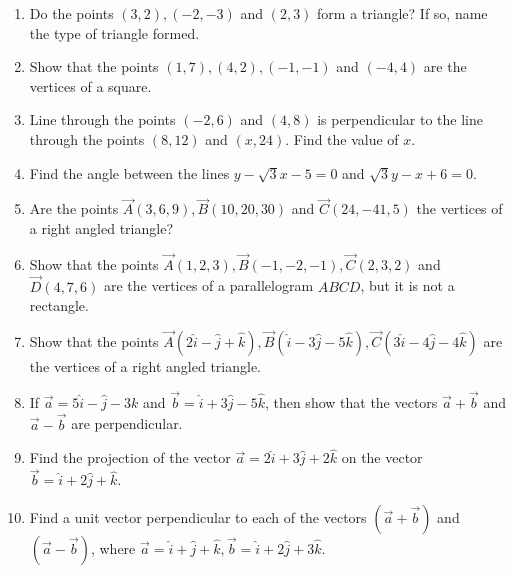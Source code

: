 \begin{enumerate}[label=\thesubsection.\arabic*, ref=\thesubsection.\theenumi]
\item Do the points $(3,2), (-2,-3)$ and $(2,3)$ form a triangle? If so, name the type of triangle formed.
\item Show that the points $(1,7),(4,2),(-1,-1)$ and $(-4,4)$ are the vertices of a square.
\item Line through the points $(-2,6)$ and $(4,8)$ is perpendicular to the line through the points $(8,12)$ and $(x,24)$. Find the value of $x$.
\item Find the angle between the lines $y-\sqrt 3x-5=0$ and $\sqrt 3y-x+6=0$.
\item Are the points $\vec{A}(3,6,9), \vec{B}(10,20,30)$ and $\vec{C}(24,-41,5)$ the vertices of a right angled triangle?
\item Show that the points $\vec{A}(1,2,3), \vec{B}(-1,-2,-1), \vec{C}(2,3,2)$ and $\vec{D}(4,7,6)$ are the vertices of a parallelogram $ABCD$, but it is not a rectangle.
\item Show that the points $\vec{A}(2\hat{i} -\hat{j} +\hat{k}), \vec{B}(\hat{i} -3\hat{j}-5\hat{k}),\vec{C}(3\hat{i} -4\hat{j} -4\hat{k})$ are the vertices of a right angled triangle.
\item If $\overrightarrow{a} = 5\hat{i} -\hat{j} -3{k}$ and $\overrightarrow{b} = \hat{i} +3\hat{j} -5\hat{k}$, then show that the vectors $\overrightarrow{a}+\overrightarrow{b}$ and $\overrightarrow{a}-\overrightarrow{b}$ are perpendicular.
\item Find the projection of the vector $\overrightarrow{a} = 2\hat{i} +3\hat{j} +2\hat{k}$ on the vector $\overrightarrow{b} = \hat{i} +2\hat{j} +\hat{k}$.
\item Find a unit vector perpendicular to each of the vectors $(\overrightarrow{a} +\overrightarrow{b})$ and $(\overrightarrow{a} -\overrightarrow{b})$, where $\overrightarrow{a}=\hat{i} +\hat{j} +\hat{k}, \overrightarrow{b} = \hat{i} +2\hat{j} +3\hat{k}$.
\end{enumerate}

